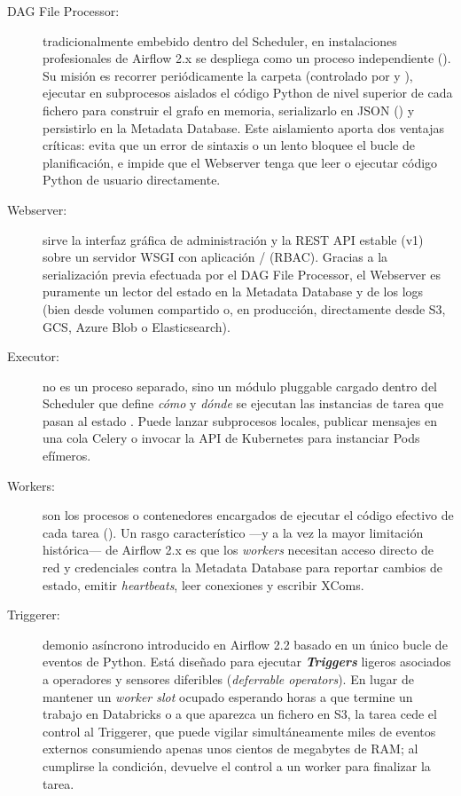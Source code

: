 \begin{description}
  \item[DAG File Processor:] tradicionalmente embebido dentro del Scheduler, en instalaciones profesionales de Airflow 2.x se despliega como un proceso independiente (). Su misión es recorrer periódicamente la carpeta  (controlado por  y ), ejecutar en subprocesos aislados el código Python de nivel superior de cada fichero para construir el grafo en memoria, serializarlo en JSON () y persistirlo en la Metadata Database. Este aislamiento aporta dos ventajas críticas: evita que un error de sintaxis o un  lento bloquee el bucle de planificación, e impide que el Webserver tenga que leer o ejecutar código Python de usuario directamente.

  \item[Webserver:] sirve la interfaz gráfica de administración y la REST API estable (v1) sobre un servidor WSGI  con aplicación  /  (RBAC). Gracias a la serialización previa efectuada por el DAG File Processor, el Webserver es puramente un lector del estado en la Metadata Database y de los logs (bien desde volumen compartido o, en producción, directamente desde S3, GCS, Azure Blob o Elasticsearch).

  \item[Executor:] no es un proceso separado, sino un módulo pluggable cargado dentro del Scheduler que define \textit{cómo} y \textit{dónde} se ejecutan las instancias de tarea que pasan al estado . Puede lanzar subprocesos locales, publicar mensajes en una cola Celery o invocar la API de Kubernetes para instanciar Pods efímeros.

  \item[Workers:] son los procesos o contenedores encargados de ejecutar el código efectivo de cada tarea (). Un rasgo característico ---y a la vez la mayor limitación histórica--- de Airflow 2.x es que los \textit{workers} necesitan acceso directo de red y credenciales contra la Metadata Database para reportar cambios de estado, emitir \textit{heartbeats}, leer conexiones y escribir XComs.

  \item[Triggerer:] demonio asíncrono introducido en Airflow 2.2 basado en un único bucle de eventos  de Python. Está diseñado para ejecutar \textbf{\textit{Triggers}} ligeros asociados a operadores y sensores diferibles (\textit{deferrable operators}). En lugar de mantener un \textit{worker slot} ocupado esperando horas a que termine un trabajo en Databricks o a que aparezca un fichero en S3, la tarea cede el control al Triggerer, que puede vigilar simultáneamente miles de eventos externos consumiendo apenas unos cientos de megabytes de RAM; al cumplirse la condición, devuelve el control a un worker para finalizar la tarea.
\end{description}


